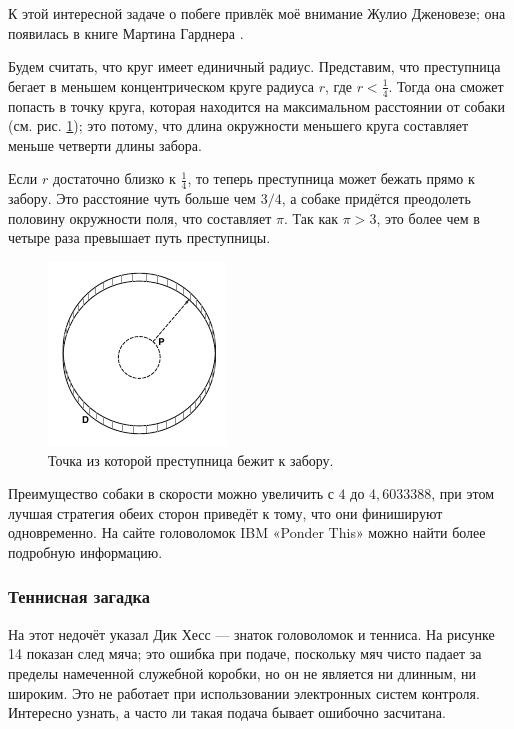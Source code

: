 К этой интересной задаче о побеге привлёк моё внимание Жулио Дженовезе;
она появилась в книге Мартина Гарднера \cite{24}.

Будем считать, что круг имеет единичный радиус.
Представим, что преступница бегает в меньшем концентрическом круге радиуса $r$, где $r < \tfrac14$.
Тогда она сможет попасть в точку круга, которая находится на максимальном расстоянии от собаки (см. рис. \ref{pic:dog});
это потому, что длина окружности меньшего круга составляет меньше четверти длины забора.

Если $r$ достаточно близко к $\tfrac14$, то теперь преступница может бежать прямо к забору.
Это расстояние чуть больше чем $3/4$, а собаке придётся преодолеть половину окружности поля, что составляет $\pi$.
Так как $\pi > 3$, это более чем в четыре раза превышает путь преступницы.

\begin{figure}[h!]
\centering
\includegraphics[scale=1]{pics/dog}
\caption{Точка из которой преступница бежит к забору.}
\label{pic:dog}
\end{figure}

Преимущество собаки в скорости можно увеличить с $4$ до $4{,}6033388$, при этом лучшая стратегия обеих сторон приведёт к тому, что они финишируют одновременно.
На сайте головоломок IBM «Ponder This» \cite[май 2001]{ponder-this} можно найти более подробную информацию.

\subsubsection*{Теннисная загадка}

На этот недочёт указал Дик Хесс --- знаток головоломок и тенниса.
На рисунке 14 показан след мяча; это ошибка при подаче, поскольку мяч чисто падает за пределы намеченной служебной коробки, но он не является ни длинным, ни широким.
Это не работает при использовании электронных систем контроля.
Интересно узнать, а часто ли такая подача бывает ошибочно засчитана.

